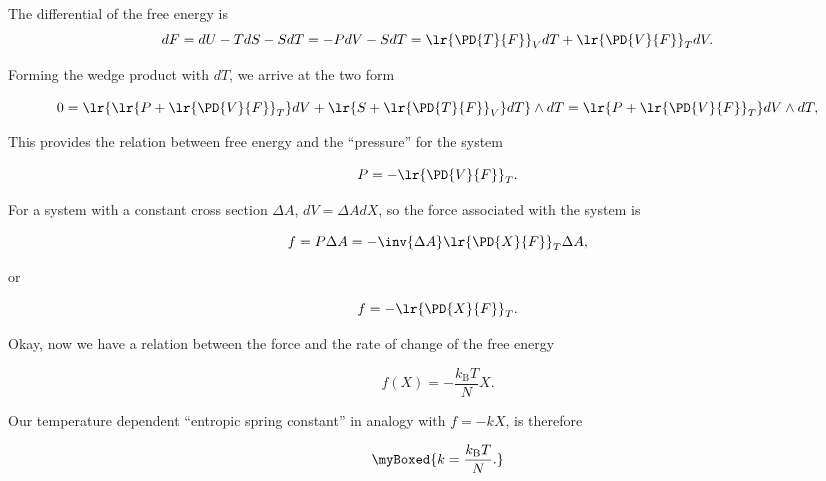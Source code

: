 {The differential of the free energy is 
\begin{dmath}\label{eqn:basicStatMechProblemSet5Problem1:180}
dF 
= dU - T dS - S dT
= -P dV - S dT
= 
\lr{\PD{T}{F}}_V dT
+
\lr{\PD{V}{F}}_T dV.
\end{dmath}

Forming the wedge product with $dT$, we arrive at the two form

\begin{dmath}\label{eqn:basicStatMechProblemSet5Problem1:200}
0 = 
\lr{
\lr{ P + 
\lr{\PD{V}{F}}_T 
} dV
+ \lr{ S +
\lr{\PD{T}{F}}_V 
} dT } \wedge dT
=
\lr{ P + 
\lr{\PD{V}{F}}_T 
} dV \wedge dT,
\end{dmath}

This provides the relation between free energy and the ``pressure'' for the system

\begin{equation}\label{eqn:basicStatMechProblemSet5Problem1:220}
P = - \lr{\PD{V}{F}}_T.
\end{equation}

For a system with a constant cross section $\Delta A$, $dV = \Delta A dX$, so the force associated with the system is

\begin{equation}\label{eqn:basicStatMechProblemSet5Problem1:240}
f = P \Delta A 
= - \inv{\Delta A} \lr{\PD{X}{F}}_T \Delta A,
\end{equation}

or

\begin{equation}\label{eqn:basicStatMechProblemSet5Problem1:n}
f = - \lr{\PD{X}{F}}_T.
\end{equation}

Okay, now we have a relation between the force and the rate of change of the free energy

\begin{equation}\label{eqn:basicStatMechProblemSet5Problem1:n}
f(X) = -\frac{k_{\mathrm{B}} T}{N} X.
\end{equation}

Our temperature dependent ``entropic spring constant'' in analogy with $f = -k X$, is therefore

\begin{equation}\label{eqn:basicStatMechProblemSet5Problem1:n}
\myBoxed{
k = \frac{k_{\mathrm{B}} T}{N}.
}
\end{equation}
}
